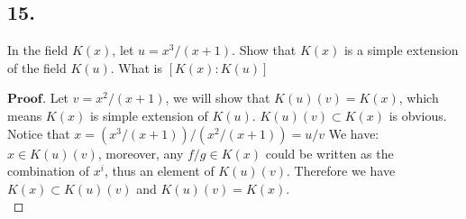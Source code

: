 \documentclass[a4paper, 11pt]{article}
\newenvironment{myprf}
{\renewcommand\qedsymbol{$ $}\begin{proof}[$\textbf{Proof}$]}
  {\end{proof}}
\begin{document}
 \subsection*{15.}
 In the field $K(x)$, let $u=x^3/(x+1)$. Show that $K(x)$ is a simple extension of the field $K(u)$. What is
 $[K(x):K(u)]$
 \begin{myprf}
         Let $v=x^2/(x+1)$, we will show that $K(u)(v)=K(x)$, which means $K(x)$ is simple extension of $K(u)$.
         $K(u)(v)\subset K(x)$ is obvious. Notice that $x=(x^3/(x+1))/(x^2/(x+1))=u/v$ We have:$x\in K(u)(v)$,
         moreover, any $f/g\in K(x)$ could be written as the combination of $x^i$, thus an element of $K(u)(v)$.
         Therefore we have $K(x)\subset K(u)(v)$ and $K(u)(v)=K(x)$.\\
 \end{myprf}
\end{document}
